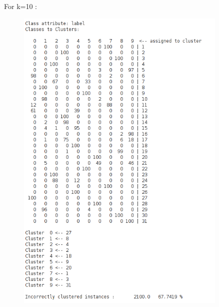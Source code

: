 \documentclass[paper=a4, fontsize=11pt]{scrartcl}
\numberwithin{equation}{section}		%
\numberwithin{figure}{section}			%
\numberwithin{table}{section}				%
\begin{document}
For k=10 :
\begin{figure}[H]
	\centering
  \includegraphics[width=0.9\textwidth]{k_10}{\label{k=50: cluster vs label}}
\end{figure}
\end{document}
